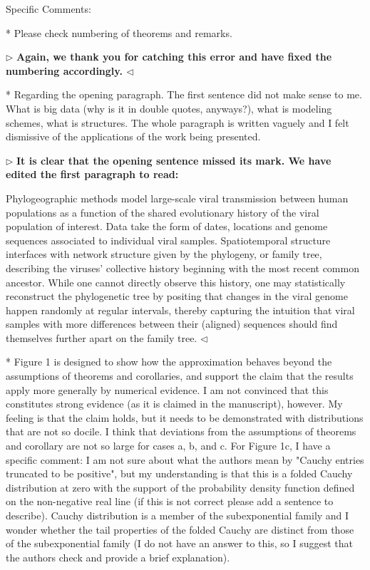 \documentclass[12pt]{article}
\newenvironment{reply}{$\triangleright$\bfseries}{$\triangleleft$}
\renewenvironment{quote}
               {\list{}{\rightmargin\leftmargin}%
                \item\relax\normalfont}
               {\endlist}
\begin{document}
Specific Comments: 

* Please check numbering of theorems and remarks. 

\begin{reply}
	Again, we thank you for catching this error and have fixed the numbering accordingly. 
\end{reply}

* Regarding the opening paragraph. The first sentence did not make sense to me. What is big data (why is it in double quotes, anyways?), what is modeling schemes, what is structures. The whole paragraph is written vaguely and I felt dismissive of the applications of the work being presented. 

\begin{reply}
	It is clear that the opening sentence missed its mark.  We have edited the first paragraph to read:
	\begin{quote}
		Phylogeographic methods
	\cite{lemey2009bayesian, lemey2014unifying, holbrook2021massive,
	holbrook2022viral} model large-scale viral transmission between
human populations as a function of the shared evolutionary history of
the viral population of interest.  Data take the form of dates,
locations and genome sequences associated to individual viral
samples. Spatiotemporal structure interfaces with network structure
given by the phylogeny, or family tree, describing the viruses'
collective history beginning with the most recent common ancestor.
While one cannot directly observe this history, one may statistically
reconstruct the phylogenetic tree by positing that changes in the
viral genome happen randomly at regular intervals, thereby capturing
the intuition that viral samples with more differences between their
(aligned) sequences should find themselves further apart on the family
tree.
	\end{quote}
\end{reply}

* Figure 1 is designed to show how the approximation behaves beyond the assumptions of theorems and corollaries, and support the claim that the results apply more generally by numerical evidence. I am not convinced that this constitutes strong evidence (as it is claimed in the manuscript), however. My feeling is that the claim holds, but it needs to be demonstrated with distributions that are not so docile. I think that deviations from the assumptions of theorems and corollary are not so large for cases a, b, and c. For Figure 1c, I have a specific comment: I am not sure about what the authors mean by "Cauchy entries truncated to be positive", but my understanding is that this is a folded Cauchy distribution at zero with the support of the probability density function defined on the non-negative real line (if this is not correct please add a sentence to describe). Cauchy distribution is a member of the subexponential family and I wonder whether the tail properties of the folded Cauchy are distinct from those of the subexponential family (I do not have an answer to this, so I suggest that the authors check and provide a brief explanation). 
\end{document}
